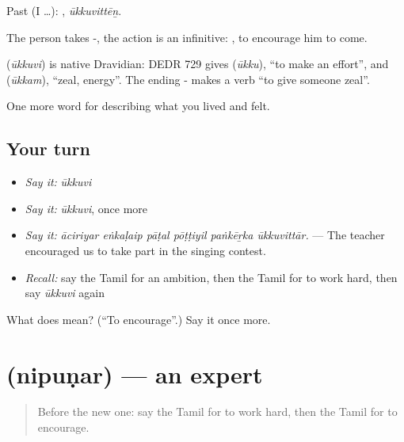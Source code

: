 Past (I …): , \emph{ūkkuvittēṉ}.

The person takes -, the action is an infinitive:   , to encourage him to come.

\begin{cousinweb}
\textbf{} (\emph{ūkkuvi}) is native Dravidian: DEDR 729 gives  (\emph{ūkku}), \textquotedblleft{}to make an effort\textquotedblright{}, and  (\emph{ūkkam}), \textquotedblleft{}zeal, energy\textquotedblright{}. The ending - makes a verb \textquotedblleft{}to give someone zeal\textquotedblright{}.
\end{cousinweb}

\begin{grammarlens}[title={What you've built}]
One more word for describing what you lived and felt.
\end{grammarlens}

\subsection*{Your turn}
\begin{itemize}
\raggedright
  \item \emph{Say it:} \emph{ūkkuvi}
  \item \emph{Say it:} \emph{ūkkuvi}, once more
  \item \emph{Say it:} \emph{āciriyar eṅkaḷaip pāṭal pōṭṭiyil paṅkēṟka ūkkuvittār.} — The teacher encouraged us to take part in the singing contest.
  \item \emph{Recall:} say the Tamil for an ambition, then the Tamil for to work hard, then say \emph{ūkkuvi} again
\end{itemize}

\begin{tcolorbox}[breakable,colback=teal!4,colframe=teal!35!black,title={Before you move on}]
What does  mean? (\textquotedblleft{}To encourage\textquotedblright{}.) Say it once more.
\end{tcolorbox}
\section[\texorpdfstring{\ta{நிபுணர்} (nipuṇar)}{நிபுணர் (nipuṇar)}]{ (nipuṇar) — an expert}

\label{lesson:TA-C509-nipunar}



\begin{quote}
Before the new one: say the Tamil for to work hard, then the Tamil for to encourage.
\end{quote}

